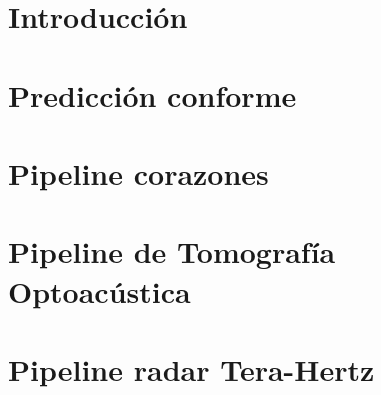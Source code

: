 \documentclass[12pt]{report}
\numberwithin{equation}{section}
\numberwithin{figure}{section}
\numberwithin{table}{section}
\theoremstyle{definition}
\begin{document}
\begin{flushleft}

\setlength{\parindent}{12pt}
\newcommand{\norm}[1]{\left\lVert#1\right\rVert}

\tableofcontents
\newpage


\chapter{Introducción}


%
%
%




\chapter{Predicción conforme}


\chapter{Pipeline corazones}


\chapter{Pipeline de Tomografía Optoacústica}




\chapter{Pipeline radar Tera-Hertz}




\end{flushleft}
\end{document}
